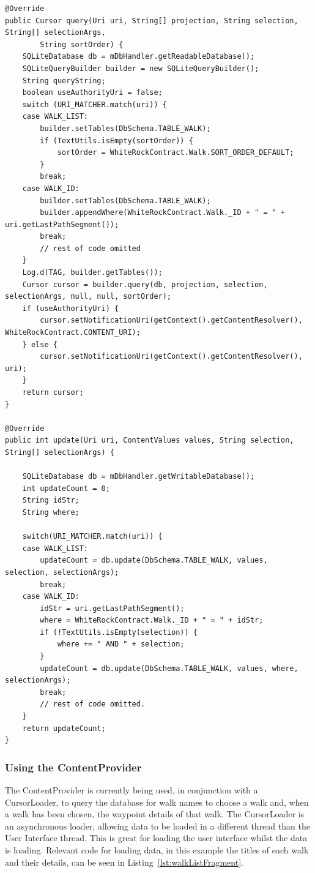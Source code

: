 \documentclass[11pt,a4paper]{article}
\begin{document}
\begin{lstlisting}[captionpos=b, caption=WhiteRockContentProvider Snippet, label=lst:contentprovider, frame=single]
@Override
public Cursor query(Uri uri, String[] projection, String selection, String[] selectionArgs,
        String sortOrder) {
    SQLiteDatabase db = mDbHandler.getReadableDatabase();
    SQLiteQueryBuilder builder = new SQLiteQueryBuilder();
    String queryString;
    boolean useAuthorityUri = false;
    switch (URI_MATCHER.match(uri)) {
    case WALK_LIST:
        builder.setTables(DbSchema.TABLE_WALK);
        if (TextUtils.isEmpty(sortOrder)) {
            sortOrder = WhiteRockContract.Walk.SORT_ORDER_DEFAULT;
        }
        break;
    case WALK_ID:
        builder.setTables(DbSchema.TABLE_WALK);
        builder.appendWhere(WhiteRockContract.Walk._ID + " = " + uri.getLastPathSegment());
        break;
        // rest of code omitted
    }
    Log.d(TAG, builder.getTables());
    Cursor cursor = builder.query(db, projection, selection, selectionArgs, null, null, sortOrder);
    if (useAuthorityUri) {
        cursor.setNotificationUri(getContext().getContentResolver(), WhiteRockContract.CONTENT_URI);
    } else {
        cursor.setNotificationUri(getContext().getContentResolver(), uri);
    }
    return cursor;
}

@Override
public int update(Uri uri, ContentValues values, String selection, String[] selectionArgs) {

    SQLiteDatabase db = mDbHandler.getWritableDatabase();
    int updateCount = 0;
    String idStr;
    String where;

    switch(URI_MATCHER.match(uri)) {
    case WALK_LIST:
        updateCount = db.update(DbSchema.TABLE_WALK, values, selection, selectionArgs);
        break;
    case WALK_ID:
        idStr = uri.getLastPathSegment();
        where = WhiteRockContract.Walk._ID + " = " + idStr;
        if (!TextUtils.isEmpty(selection)) {
            where += " AND " + selection;
        }
        updateCount = db.update(DbSchema.TABLE_WALK, values, where, selectionArgs);
        break;
        // rest of code omitted.
    }
    return updateCount;
}

\end{lstlisting}

\subsubsection{Using the ContentProvider}
The ContentProvider is currently being used, in conjunction with a CursorLoader, to query the database for walk names to choose a walk and, when a walk has been chosen, the waypoint details of that walk. The CursorLoader is an asynchronous loader, allowing data to be loaded in a different thread than the User Interface thread. This is great for loading the user interface whilst the data is loading. Relevant code for loading data, in this example the titles of each walk and their details, can be seen in Listing~\ref{lst:walkListFragment}.
\end{document}
